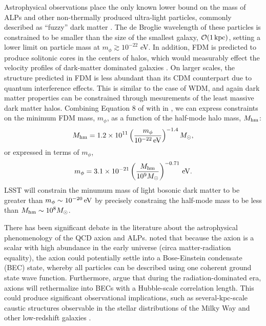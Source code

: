 Astrophysical observations place the only known lower bound on the mass of ALPs and other non-thermally produced ultra-light particles, commonly described as ``fuzzy'' dark matter \citep[FDM; \eg,][]{Hu:2000,Hui:2017}. 
The de Broglie wavelength of these particles is constrained to be smaller than the size of the smallest galaxy, $\mathcal{O}(1\mathrm{\,kpc})$, setting a lower limit on particle mass at $m_\phi \gtrsim 10^{-22}$ eV. 
In addition, FDM is predicted to produce solitonic cores in the centers of halos, which would measurably effect the velocity profiles of dark-matter dominated galaxies \citep{Robles:2012uy,Robles:2018fur,Schive:2014hza,Du:2016aik}. 
On larger scales, the structure predicted in FDM is less abundant than its CDM counterpart due to quantum interference effects.
This is similar to the case of WDM, and again dark matter properties can be constrained through mesurements of the least massive dark matter halos.
Combining Equation 8 of \citet[][]{1703.09126} with  in , we can express constraints on the minimum FDM mass, $m_\phi$, as a function of the half-mode halo mass, $M_{\rm hm}$:
\begin{equation}
M_{\rm hm} = 1.2 \times 10^{11} \left( \frac{m_\phi}{10^{-22}\mathrm{\,eV}} \right)^{-1.4} M_\odot,
\end{equation}
or expressed in terms of $m_\phi$, 
\begin{equation}
m_\phi = 3.1 \times 10^{-21} \left( \frac{M_{\rm hm}}{10^{9}M_\odot} \right)^{-0.71} \mathrm{\,eV}.
\end{equation}
LSST will constrain the minumum mass of light bosonic dark matter to be greater than $m_\phi \sim 10^{-20} \mathrm{\,eV}$ by precisely constraing the half-mode mass to be less than $M_{\rm hm} \sim 10^{8} M_\odot$.


There has been significant debate in the literature about the astrophysical phenomenology of the QCD axion and ALPs.
\citet{Sikivie:2009} noted that because the axion is a scalar with high abundance in the early universe (circa matter-radiation equality), the axion could potentially settle into a Bose-Einstein condensate (BEC) state, whereby all particles can be described using one coherent ground state wave function. 
Furthermore, \citet{Sikivie:2009} argue that during the radiation-dominated era, axions will rethermalize into BECs with a Hubble-scale correlation length.
This could produce significant observational implications, such as several-kpc-scale caustic structures observable in the stellar distributions of the Milky Way and other low-redshift galaxies \citep[\eg,][]{Natarajan:2006,0805.4556,Rindler-Daller:2013zxa}.

